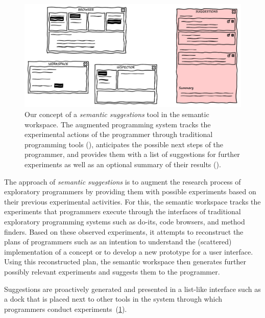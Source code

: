 \begin{figure}
	\centering
	\includegraphics[width=\textwidth]{02_workspace/suggestions.png}
	\caption[Our concept of a \emph{semantic suggestions} tool in the semantic workspace.]{
		Our concept of a \emph{semantic suggestions} tool in the semantic workspace.
		The augmented programming system tracks the experimental actions of the programmer through traditional programming tools (\bold{\textcolor{gray}{gray}}), anticipates the possible next steps of the programmer, and provides them with a list of suggestions for further experiments as well as an optional summary of their results (\bold{\textcolor{red}{red}}).
	}
	\label{fig:approach/workspace/suggestions}
\end{figure}

The approach of \emph{semantic suggestions} is to augment the research process of exploratory programmers by providing them with possible experiments based on their previous experimental activities.
For this, the semantic workspace tracks the experiments that programmers execute through the interfaces of traditional exploratory programming systems such as do-its, code browsers, and method finders.
Based on these observed experiments, it attempts to reconstruct the plans of programmers such as an intention to understand the (scattered) implementation of a concept or to develop a new prototype for a user interface.
Using this reconstructed plan, the semantic workspace then generates further possibly relevant experiments and suggests them to the programmer.

Suggestions are proactively generated and presented in a list-like interface such as a dock that is placed next to other tools in the system through which programmers conduct experiments~(\cref{fig:approach/workspace/suggestions}).

